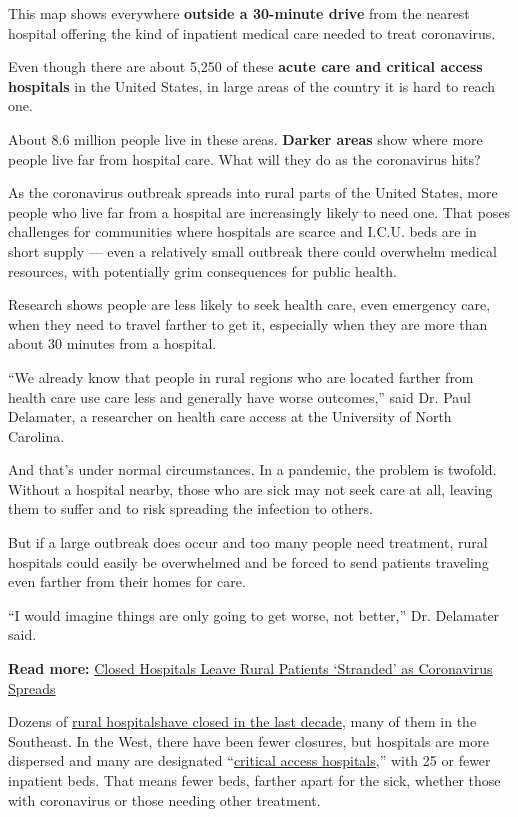 This map shows everywhere \textbf{outside a 30-minute drive} from the
nearest hospital offering the kind of inpatient medical care needed to
treat coronavirus.

Even though there are about 5,250 of these \textbf{acute care and
critical access hospitals} in the United States, in large areas of the
country it is hard to reach one.

About 8.6 million people live in these areas. \textbf{Darker areas} show
where more people live far from hospital care. What will they do as the
coronavirus hits?

As the coronavirus outbreak spreads into rural parts of the United
States, more people who live far from a hospital are increasingly likely
to need one. That poses challenges for communities where hospitals are
scarce and I.C.U. beds are in short supply --- even a relatively small
outbreak there could overwhelm medical resources, with potentially grim
consequences for public health.

Research shows people are less likely to seek health care, even
emergency care, when they need to travel farther to get it, especially
when they are more than about 30 minutes from a hospital.

``We already know that people in rural regions who are located farther
from health care use care less and generally have worse outcomes,'' said
Dr. Paul Delamater, a researcher on health care access at the University
of North Carolina.

And that's under normal circumstances. In a pandemic, the problem is
twofold. Without a hospital nearby, those who are sick may not seek care
at all, leaving them to suffer and to risk spreading the infection to
others.

But if a large outbreak does occur and too many people need treatment,
rural hospitals could easily be overwhelmed and be forced to send
patients traveling even farther from their homes for care.

``I would imagine things are only going to get worse, not better,'' Dr.
Delamater said.

\textbf{Read more:}
\href{https://www.nytimes3xbfgragh.onion/2020/04/26/us/hospital-closures-west-virginia-ohio.html}{Closed
Hospitals Leave Rural Patients `Stranded' as Coronavirus Spreads}

Dozens of
\href{https://www.shepscenter.unc.edu/programs-projects/rural-health/rural-hospital-closures/}{rural
hospitals}\href{https://www.shepscenter.unc.edu/programs-projects/rural-health/rural-hospital-closures/}{have
closed in the last decade}, many of them in the Southeast. In the West,
there have been fewer closures, but hospitals are more dispersed and
many are designated
``\href{https://www.ruralhealthinfo.org/topics/critical-access-hospitals}{critical
access hospitals},'' with 25 or fewer inpatient beds. That means fewer
beds, farther apart for the sick, whether those with coronavirus or
those needing other treatment.


